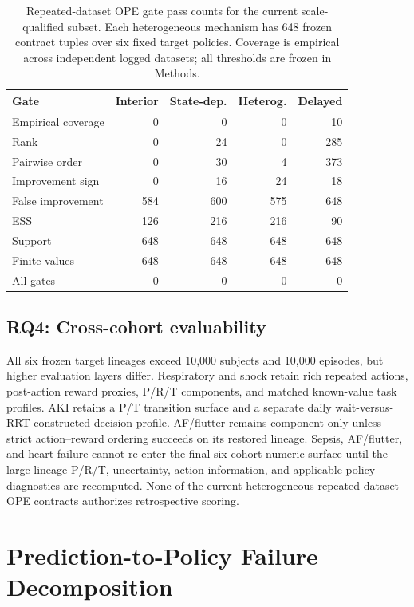 \documentclass[sigconf,review]{acmart}
\begin{document}
\begin{table}[t]
\centering
\caption{Repeated-dataset OPE gate pass counts for the current scale-qualified subset. Each heterogeneous mechanism has 648 frozen contract tuples over six fixed target policies. Coverage is empirical across independent logged datasets; all thresholds are frozen in Methods.}
\label{tab:ope}
\scriptsize
\begin{tabular}{lrrrr}
\toprule
Gate & Interior & State-dep. & Heterog. & Delayed \\
\midrule
Empirical coverage & 0 & 0 & 0 & 10 \\
Rank & 0 & 24 & 0 & 285 \\
Pairwise order & 0 & 30 & 4 & 373 \\
Improvement sign & 0 & 16 & 24 & 18 \\
False improvement & 584 & 600 & 575 & 648 \\
ESS & 126 & 216 & 216 & 90 \\
Support & 648 & 648 & 648 & 648 \\
Finite values & 648 & 648 & 648 & 648 \\
\midrule
All gates & 0 & 0 & 0 & 0 \\
\bottomrule
\end{tabular}
\end{table}

\subsection{RQ4: Cross-cohort evaluability}

All six frozen target lineages exceed 10,000 subjects and 10,000 episodes, but higher evaluation layers differ. Respiratory and shock retain rich repeated actions, post-action reward proxies, P/R/T components, and matched known-value task profiles. AKI retains a P/T transition surface and a separate daily wait-versus-RRT constructed decision profile. AF/flutter remains component-only unless strict action--reward ordering succeeds on its restored lineage. Sepsis, AF/flutter, and heart failure cannot re-enter the final six-cohort numeric surface until the large-lineage P/R/T, uncertainty, action-information, and applicable policy diagnostics are recomputed. None of the current heterogeneous repeated-dataset OPE contracts authorizes retrospective scoring.

\section{Prediction-to-Policy Failure Decomposition}
\end{document}
